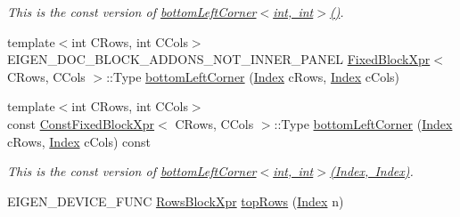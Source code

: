 \begin{DoxyCompactItemize}
\begin{DoxyCompactList}\small\item\em This is the const version of \mbox{\hyperlink{class_eigen_1_1_sparse_matrix_base_af0e6f2ff2f449cae8f7b19bd34dec4ce}{bottom\+Left\+Corner$<$int, int$>$()}}. \end{DoxyCompactList}\item 
{\footnotesize template$<$int C\+Rows, int C\+Cols$>$ }\\E\+I\+G\+E\+N\+\_\+\+D\+O\+C\+\_\+\+B\+L\+O\+C\+K\+\_\+\+A\+D\+D\+O\+N\+S\+\_\+\+N\+O\+T\+\_\+\+I\+N\+N\+E\+R\+\_\+\+P\+A\+N\+EL \mbox{\hyperlink{struct_eigen_1_1_sparse_matrix_base_1_1_fixed_block_xpr}{Fixed\+Block\+Xpr}}$<$ C\+Rows, C\+Cols $>$\+::Type \mbox{\hyperlink{class_eigen_1_1_sparse_matrix_base_a311507cde6d998e651ec6b41c550f6c2}{bottom\+Left\+Corner}} (\mbox{\hyperlink{struct_eigen_1_1_eigen_base_a554f30542cc2316add4b1ea0a492ff02}{Index}} c\+Rows, \mbox{\hyperlink{struct_eigen_1_1_eigen_base_a554f30542cc2316add4b1ea0a492ff02}{Index}} c\+Cols)
\item 
\mbox{\label{class_eigen_1_1_sparse_matrix_base_a6269d34c9bb1277d1470d0c948361a81}} 
{\footnotesize template$<$int C\+Rows, int C\+Cols$>$ }\\const \mbox{\hyperlink{struct_eigen_1_1_sparse_matrix_base_1_1_const_fixed_block_xpr}{Const\+Fixed\+Block\+Xpr}}$<$ C\+Rows, C\+Cols $>$\+::Type \mbox{\hyperlink{class_eigen_1_1_sparse_matrix_base_a6269d34c9bb1277d1470d0c948361a81}{bottom\+Left\+Corner}} (\mbox{\hyperlink{struct_eigen_1_1_eigen_base_a554f30542cc2316add4b1ea0a492ff02}{Index}} c\+Rows, \mbox{\hyperlink{struct_eigen_1_1_eigen_base_a554f30542cc2316add4b1ea0a492ff02}{Index}} c\+Cols) const
\begin{DoxyCompactList}\small\item\em This is the const version of \mbox{\hyperlink{class_eigen_1_1_sparse_matrix_base_a6557dcd3512c07370630d5ce0c3fbd3e}{bottom\+Left\+Corner$<$int, int$>$(\+Index, Index)}}. \end{DoxyCompactList}\item 
E\+I\+G\+E\+N\+\_\+\+D\+E\+V\+I\+C\+E\+\_\+\+F\+U\+NC \mbox{\hyperlink{class_eigen_1_1_block}{Rows\+Block\+Xpr}} \mbox{\hyperlink{class_eigen_1_1_sparse_matrix_base_ab620d8edbf8f0d9369a7f2f9956228eb}{top\+Rows}} (\mbox{\hyperlink{struct_eigen_1_1_eigen_base_a554f30542cc2316add4b1ea0a492ff02}{Index}} n)
\item 
\mbox{\label{class_eigen_1_1_sparse_matrix_base_a8e17950f7b7a973a1e51b77a8de21c44}} 

\end{DoxyCompactItemize}
